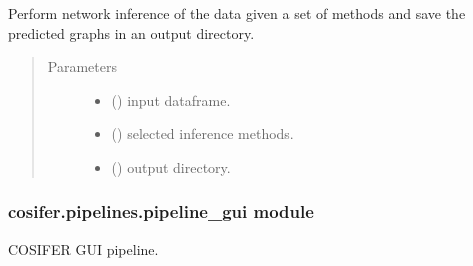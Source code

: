 \documentclass[letterpaper,10pt,english]{sphinxmanual}
\begin{document}
\begin{fulllineitems}
\label{\detokenize{_modules/cosifer.pipelines:cosifer.pipelines.pipeline_cli.run_inference}}
Perform network inference of the data given a set of methods
and save the predicted graphs in an output directory.
\begin{quote}\begin{description}
\item[{Parameters}] \leavevmode\begin{itemize}
\item {} 
 () \textendash{} input dataframe.

\item {} 
 () \textendash{} selected inference methods.

\item {} 
 () \textendash{} output directory.

\end{itemize}

\end{description}\end{quote}

\end{fulllineitems}



\subsubsection{cosifer.pipelines.pipeline\_gui module}
\label{\detokenize{_modules/cosifer.pipelines:module-cosifer.pipelines.pipeline_gui}}\label{\detokenize{_modules/cosifer.pipelines:cosifer-pipelines-pipeline-gui-module}}
COSIFER GUI pipeline.
\end{document}
